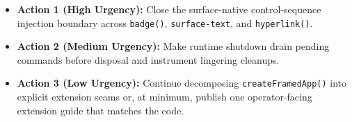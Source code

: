 \begin{itemize}
\tightlist
\item
  \textbf{Action 1 (High Urgency):} Close the surface-native control-sequence injection boundary across \texttt{b\allowbreak{}a\allowbreak{}d\allowbreak{}g\allowbreak{}e\allowbreak{}(\allowbreak{})}, \texttt{s\allowbreak{}u\allowbreak{}r\allowbreak{}f\allowbreak{}a\allowbreak{}c\allowbreak{}e\allowbreak{}-\allowbreak{}t\allowbreak{}e\allowbreak{}x\allowbreak{}t}, and \texttt{h\allowbreak{}y\allowbreak{}p\allowbreak{}e\allowbreak{}r\allowbreak{}l\allowbreak{}i\allowbreak{}n\allowbreak{}k\allowbreak{}(\allowbreak{})}.
\item
  \textbf{Action 2 (Medium Urgency):} Make runtime shutdown drain pending commands before disposal and instrument lingering cleanups.
\item
  \textbf{Action 3 (Low Urgency):} Continue decomposing \texttt{c\allowbreak{}r\allowbreak{}e\allowbreak{}a\allowbreak{}t\allowbreak{}e\allowbreak{}F\allowbreak{}r\allowbreak{}a\allowbreak{}m\allowbreak{}e\allowbreak{}d\allowbreak{}A\allowbreak{}p\allowbreak{}p\allowbreak{}(\allowbreak{})} into explicit extension seams or, at minimum, publish one operator-facing extension guide that matches the code.
\end{itemize}

